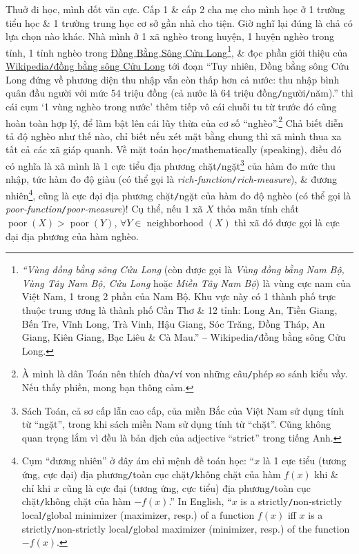 \documentclass[12pt,oneside]{book}
\begin{document}
Thuở đi học, mình dốt văn cực. Cấp 1 \& cấp 2 cha mẹ cho mình học ở 1 trường tiểu học \& 1 trường trung học cơ sở gần nhà cho tiện. Giờ nghĩ lại đúng là chả có lựa chọn nào khác. Nhà mình ở 1 xã nghèo trong huyện, 1 huyện nghèo trong tỉnh, 1 tỉnh nghèo trong \href{https://vi.wikipedia.org/wiki/%C4%90%E1%BB%93ng_b%E1%BA%B1ng_s%C3%B4ng_C%E1%BB%ADu_Long}{Đồng Bằng Sông Cửu Long}\footnote{{\it``Vùng đồng bằng sông Cửu Long} (còn được gọi là {\it Vùng đồng bằng Nam Bộ, Vùng Tây Nam Bộ, Cửu Long} hoặc {\it Miền Tây Nam Bộ}) là vùng cực nam của Việt Nam, 1 trong 2 phần của Nam Bộ. Khu vực này có 1 thành phố trực thuộc trung ương là thành phố Cần Thơ \& 12 tỉnh: Long An, Tiền Giang, Bến Tre, Vĩnh Long, Trà Vinh, Hậu Giang, Sóc Trăng, Đồng Tháp, An Giang, Kiên Giang, Bạc Liêu \& Cà Mau.'' -- Wikipedia{\tt/}đồng bằng sông Cửu Long.}, \& đọc phần giới thiệu của \href{https://vi.wikipedia.org/wiki/%C4%90%E1%BB%93ng_b%E1%BA%B1ng_s%C3%B4ng_C%E1%BB%ADu_Long}{Wikipedia{\tt/}đồng bằng sông Cửu Long} tới đoạn ``Tuy nhiên, Đồng bằng sông Cửu Long đứng về phương diện thu nhập vẫn còn thấp hơn cả nước: thu nhập bình quân đầu người với mức 54 triệu đồng (cả nước là 64 triệu đồng{\tt/}người{\tt/}năm).'' thì cái cụm `1 vùng nghèo trong nước' thêm tiếp vô cái chuỗi tu từ trước đó cũng hoàn toàn hợp lý, để làm bật lên cái lũy thừa của cơ số ``nghèo''.\footnote{À mình là dân Toán nên thích đùa{\tt/}ví von những câu{\tt/}phép so sánh kiểu vầy. Nếu thấy phiền, mong bạn thông cảm.} Chả biết diễn tả độ nghèo như thế nào, chỉ biết nếu xét mặt bằng chung thì xã mình thua xa tất cả các xã giáp quanh. Về mặt toán học{\tt/}mathematically (speaking), điều đó có nghĩa là xã mình là 1 cực tiểu địa phương chặt{\tt/}ngặt\footnote{Sách Toán, cả sơ cấp lẫn cao cấp, của miền Bắc của Việt Nam sử dụng tính từ ``ngặt'', trong khi sách miền Nam sử dụng tính từ ``chặt''. Cũng không quan trọng lắm vì đều là bản dịch của adjective ``strict'' trong tiếng Anh.} của hàm đo mức thu nhập, tức hàm đo độ giàu (có thể gọi là {\it rich-function}{\tt/}{\it rich-measure}), \& đương nhiên\footnote{Cụm ``đương nhiên'' ở đây ám chỉ mệnh đề toán học: ``$x$ là 1 cực tiểu (tương ứng, cực đại) địa phương{\tt/}toàn cục chặt{\tt/}không chặt của hàm $f(x)$ khi \& chỉ khi $x$ cũng là cực đại (tương ứng, cực tiểu) địa phương{\tt/}toàn cục chặt{\tt/}không chặt của hàm $-f(x)$.'' In English, ``$x$ is a strictly{\tt/}non-strictly local{\tt/}global minimizer (maximizer, resp.) of a function $f(x)$ iff $x$ is a strictly{\tt/}non-strictly local{\tt/}global maximizer (minimizer, resp.) of the function $-f(x)$.}, cũng là cực đại địa phương chặt{\tt/}ngặt của hàm đo độ nghèo (có thể gọi là {\it poor-function}{\tt/}{\it poor-measure})! Cụ thể, nếu 1 xã $X$ thỏa mãn tính chất $\operatorname{poor}(X) > \operatorname{poor}(Y)$, $\forall Y\in\operatorname{neighborhood}(X)$ thì xã đó được gọi là cực đại địa phương của hàm nghèo.
\end{document}
